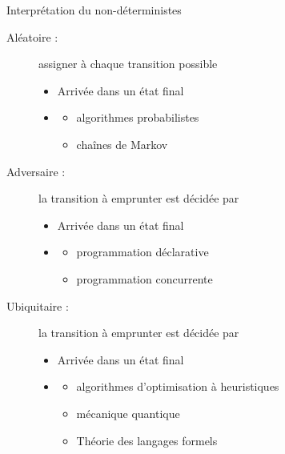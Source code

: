 
\begingroup

\begin{frame}{Interprétation du non-déterministes}

  \begin{description}
  \item[Aléatoire :] assigner  à chaque transition possible
    \begin{itemize}
    \item Arrivée dans un état final 
    \item {} 
      \begin{itemize}
      \item algorithmes probabilistes
      \item chaînes de Markov
      \end{itemize}
    \end{itemize}
  \item[Adversaire :] la transition à emprunter est décidée par 
    \begin{itemize}
    \item Arrivée dans un état final 
    \item {} 
      \begin{itemize}
      \item programmation déclarative
      \item programmation concurrente
      \end{itemize}
    \end{itemize}
  \item[Ubiquitaire :] la transition à emprunter est décidée par 
    \begin{itemize}
    \item Arrivée dans un état final 
    \item {} 
      \begin{itemize}
      \item algorithmes d'optimisation à heuristiques
      \item mécanique quantique
      \item \alert{Théorie des langages formels}
      \end{itemize}
    \end{itemize}
  \end{description}

\end{frame}

\endgroup
\endinput
